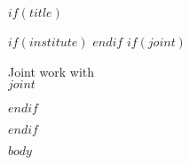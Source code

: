 \documentclass[table$if(handout)$,handout$endif$]{beamer}
\title$if(short-title)$[$short-title$]$endif${$title$}
\author{$for(author)$$author$$sep$ \and $endfor$}
\institute{$institute$}
\date{$date$}
\begin{document}
$if(title)$
\begin{frame}
  \titlepage
  $if(institute)$
  \UIlogo
  $endif$  
  $if(joint)$
  \begin{center}
  \begin{small}
  Joint work with \\
  $joint$
  \end{small}
  \end{center}
  $endif$
\end{frame}
$endif$

$body$
\end{document}
